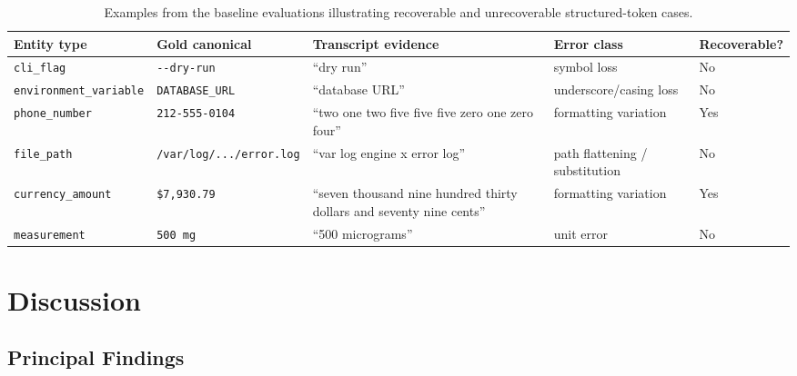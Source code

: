 \documentclass[10pt,twocolumn]{article}
\begin{document}
\begin{table}[t]\centering\footnotesize\begin{tabularx}{\textwidth}{LLLLL}
		\toprule
		Entity type                                     & Gold canonical                  & Transcript evidence     & Error class &
		Recoverable?
		\\
		\midrule
		\texttt{cli\_flag}                              & \texttt{-\kern0pt-dry-run}      & ``dry run''             & symbol loss &
		No
		\\
		\texttt{environment\_variable}                  & \texttt{DATABASE\_URL}          & ``database
		URL''                                           & underscore/casing loss          & No
		\\
		\texttt{phone\_number}                          & \texttt{212\mbox{-}555\mbox{-}0104} & ``two one two five five
		five zero one zero four''                       & formatting variation            & Yes
		\\
		\texttt{file\_path}                             & \texttt{/var/log/.\kern0pt.\kern0pt./error.log} & ``var log
		engine x error log''                            & path flattening / substitution  & No
		\\
		\texttt{currency\_amount}                       & \texttt{\$7,930.79}             & ``seven thousand nine
		hundred thirty dollars and seventy nine cents'' & formatting variation            &
		Yes
		\\
		\texttt{measurement}                            & \texttt{500 mg}                 & ``500 micrograms''      & unit error
		                                                & No
		\\
		\bottomrule
	\end{tabularx}\caption{Examples from the baseline evaluations illustrating recoverable and unrecoverable structured-token cases.}\label{tab:error-examples}\end{table}

\section{Discussion}\label{discussion}

\subsection{Principal Findings}\label{principal-findings}
\end{document}
